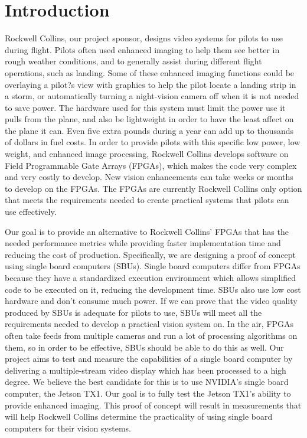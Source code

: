 \documentclass[letterpaper,10pt,titlepage]{IEEEtran}
\begin{document}
   \section{Introduction}
   Rockwell Collins, our project sponsor, designs video systems for pilots to use during flight. Pilots often used enhanced imaging to help them see better in rough weather conditions, and to generally assist during different flight operations, such as landing. Some of these enhanced imaging functions could be overlaying a pilot?s view with graphics to help the pilot locate a landing strip in a storm, or automatically turning a night-vision camera off when it is not needed to save power. The hardware used for this system must limit the power use it pulls from the plane, and also be lightweight in order to have the least affect on the plane it can. Even five extra pounds during a year can add up to thousands of dollars in fuel costs. In order to provide pilots with this specific low power, low weight, and enhanced image processing, Rockwell Collins develops software on Field Programmable Gate Arrays (FPGAs), which makes the code very complex and very costly to develop. New vision enhancements can take weeks or months to develop on the FPGAs. The FPGAs are currently Rockwell Collins only option that meets the requirements needed to create practical systems that pilots can use effectively.\\ 
\par
Our goal is to provide an alternative to Rockwell Collins' FPGAs that has the needed performance metrics while providing faster implementation time and reducing the cost of production. Specifically, we are designing a proof of concept using single board computers (SBUs). Single board computers differ from FPGAs because they have a standardized execution environment which allows simplified code to be executed on it, reducing the development time. SBUs also use low cost hardware and don't consume much power. If we can prove that the video quality produced by SBUs is adequate for pilots to use, SBUs will meet all the requirements needed to develop a practical vision system on. In the air, FPGAs often take feeds from multiple cameras and run a lot of processing algorithms on them, so in order to be effective, SBUs should be able to do this as well. Our project aims to test and measure the capabilities of a single board computer by delivering a multiple-stream video display which has been processed to a high degree. We believe the best candidate for this is to use NVIDIA's single board computer, the Jetson TX1. Our goal is to fully test the Jetson TX1's ability to provide enhanced imaging. This proof of concept will result in measurements that will help Rockwell Collins determine the practicality of using single board computers for their vision systems.
\end{document}
